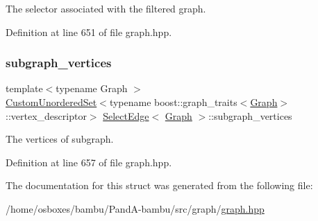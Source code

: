 The selector associated with the filtered graph. 



Definition at line 651 of file graph.\+hpp.

\mbox{\label{structSelectEdge_a1d90cd21db75b64a7a7585e8a9929d56}} 
\subsubsection{\texorpdfstring{subgraph\+\_\+vertices}{subgraph\_vertices}}
{\footnotesize\ttfamily template$<$typename Graph $>$ \\
\hyperlink{classCustomUnorderedSet}{Custom\+Unordered\+Set}$<$typename boost\+::graph\+\_\+traits$<$\hyperlink{structGraph}{Graph}$>$\+::vertex\+\_\+descriptor$>$ \hyperlink{structSelectEdge}{Select\+Edge}$<$ \hyperlink{structGraph}{Graph} $>$\+::subgraph\+\_\+vertices\hspace{0.3cm}{\ttfamily [private]}}



The vertices of subgraph. 



Definition at line 657 of file graph.\+hpp.



The documentation for this struct was generated from the following file\+:\begin{DoxyCompactItemize}
\item 
/home/osboxes/bambu/\+Pand\+A-\/bambu/src/graph/\hyperlink{graph_8hpp}{graph.\+hpp}\end{DoxyCompactItemize}
